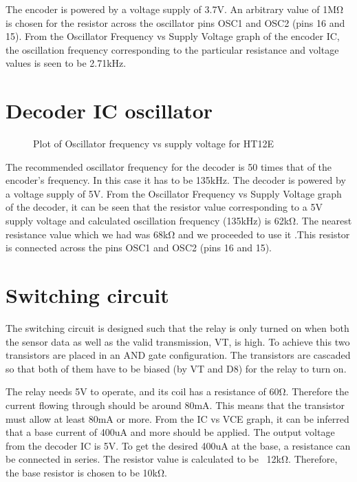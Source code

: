 \documentclass[12pt, a4paper]{report}
\newcommand{\addsvg}[2]{}
\begin{document}
\vspace*{.5cm}
The encoder is powered by a voltage supply of 3.7V. An arbitrary
value of 1MΩ is chosen for the resistor across the oscillator pins
OSC1 and OSC2 (pins 16 and 15). From the Oscillator Frequency vs
Supply Voltage graph of the encoder IC, the oscillation frequency
corresponding to the particular resistance and voltage values is seen
to be 2.71kHz.

\newpage

\section{Decoder IC oscillator}
\begin{figure}[ht]
	\centering
	\addsvg{images/dec-osc.svg}{.8\linewidth}
	\caption{Plot of Oscillator frequency vs supply voltage for HT12E}
  \end{figure}

\vspace*{.5cm}
The recommended oscillator frequency for the decoder is 50 times that
of the encoder's frequency. In this case it has to be 135kHz. The
decoder is powered by a voltage supply of 5V. From the Oscillator
Frequency vs Supply Voltage graph of the decoder, it can be seen that
the resistor value corresponding to a 5V supply voltage and
calculated oscillation frequency (135kHz) is 62kΩ. The nearest
resistance value which we had was 68kΩ and we proceeded to use it
.This resistor is connected across the pins OSC1 and OSC2 (pins 16 and 15).

\section{Switching circuit}
The switching circuit is designed such that the relay is only turned
on when both the sensor data as well as the valid transmission, VT,
is high. To achieve this two transistors are placed in an AND gate
configuration. The transistors are cascaded so that both of them have
to be biased (by VT and D8) for the relay to turn on.

The relay needs 5V to operate, and its coil has a resistance of 60Ω.
Therefore the current flowing through should be around 80mA. This
means that the transistor must allow at least 80mA or more. From the
IC vs VCE graph, it can be inferred that a base current of 400uA and
more should be applied. The output voltage from the decoder IC is 5V.
To get the desired 400uA at the base, a resistance can be connected
in series. The resistor value is calculated to be ~12kΩ. Therefore,
the base resistor is chosen to be 10kΩ.
\end{document}
